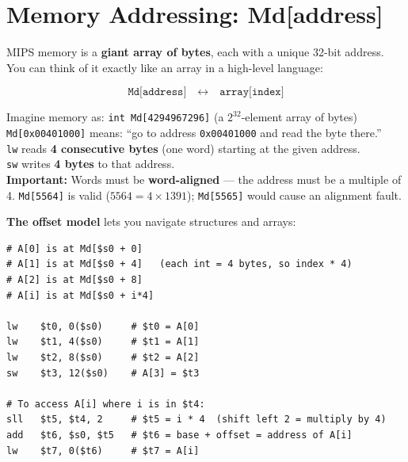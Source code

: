 \documentclass[11pt, letterpaper]{article}
\begin{document}
\section*{Memory Addressing: Md[address]}

MIPS memory is a \textbf{giant array of bytes}, each with a unique 32-bit address. You can think of it exactly like an array in a high-level language:

\[
  \texttt{Md[address]} \quad \longleftrightarrow \quad \texttt{array[index]}
\]

\begin{tcolorbox}[colback=partbg, colframe=sectionblue,
  title={\bfseries The Memory Array Analogy}, arc=3pt, boxrule=1pt]
Imagine memory as: \quad \texttt{int Md[4294967296]} \quad (a $2^{32}$-element array of bytes)\\[4pt]
\texttt{Md[0x00401000]} means: ``go to address \texttt{0x00401000} and read the byte there.''\\[4pt]
\texttt{lw} reads \textbf{4 consecutive bytes} (one word) starting at the given address.\\
\texttt{sw} writes \textbf{4 bytes} to that address.\\[4pt]
\textbf{Important:} Words must be \textbf{word-aligned} --- the address must be a multiple of 4. \texttt{Md[5564]} is valid ($5564 = 4 \times 1391$); \texttt{Md[5565]} would cause an alignment fault.
\end{tcolorbox}

\textbf{The offset model} lets you navigate structures and arrays:

\begin{lstlisting}[style=mips, caption={Accessing an array: int A[5] where \$s0 holds the base address of A}]
# A[0] is at Md[$s0 + 0]
# A[1] is at Md[$s0 + 4]   (each int = 4 bytes, so index * 4)
# A[2] is at Md[$s0 + 8]
# A[i] is at Md[$s0 + i*4]

lw    $t0, 0($s0)     # $t0 = A[0]
lw    $t1, 4($s0)     # $t1 = A[1]
lw    $t2, 8($s0)     # $t2 = A[2]
sw    $t3, 12($s0)    # A[3] = $t3

# To access A[i] where i is in $t4:
sll   $t5, $t4, 2     # $t5 = i * 4  (shift left 2 = multiply by 4)
add   $t6, $s0, $t5   # $t6 = base + offset = address of A[i]
lw    $t7, 0($t6)     # $t7 = A[i]
\end{lstlisting}

\end{document}
